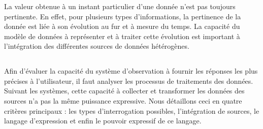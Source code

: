 \subsubsection{\critereAC}
La valeur obtenue à un instant particulier d'une donnée n'est pas toujours pertinente. En effet, pour plusieurs types d'informations, la pertinence de la donnée est liée à son évolution au fur et à mesure du temps. La capacité du modèle de données à représenter et à traiter cette évolution est important à l'intégration des différentes sources de données hétérogènes.

\subsection{\critereB}\label{sec:rw:supervision:criteres:traitement}
Afin d'évaluer la capacité du système d'observation à fournir les réponses les plus précises à l'utilisateur, il faut analyser les processus de traitements des données. Suivant les systèmes, cette capacité à collecter et transformer les données des sources n'a pas la même puissance expressive. Nous détaillons ceci en quatre critères principaux : les types d'interrogation possibles, l'intégration de sources, le langage d'expression et enfin le pouvoir expressif de ce langage.

